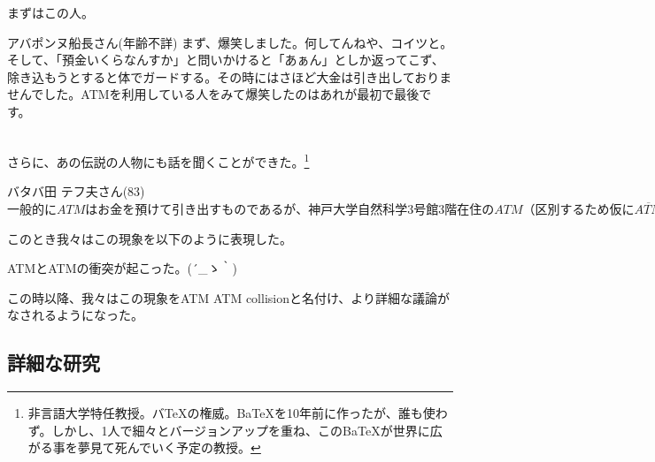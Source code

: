 \documentclass[12pt]{jsarticle}
\begin{document}
まずはこの人。\\

\begin{itembox}[c]{アバポンヌ船長さん(年齢不詳)}
まず、爆笑しました。何してんねや、コイツと。そして、「預金いくらなんすか」と問いかけると「あぁん」としか返ってこず、除き込もうとすると体でガードする。その時にはさほど大金は引き出しておりませんでした。ATMを利用している人をみて爆笑したのはあれが最初で最後です。
\end{itembox}
\\

さらに、あの伝説の人物にも話を聞くことができた。\footnote{非言語大学特任教授。バTeXの権威。BaTeXを10年前に作ったが、誰も使わず。しかし、1人で細々とバージョンアップを重ね、このBaTeXが世界に広がる事を夢見て死んでいく予定の教授。} \\
\begin{itembox}[c]{バタバ田 テフ夫さん(83) }
$一般的にATMはお金を預けて引き出すものであるが、神戸大学自然科学3号館3階在住のATM（区別するため仮に\overline{ATM}とする。）はこれとは逆の性質を持ち、お金を借り入れることができる。
このことから一部では\overline{ATM}がATMの反物質ではないかという理論予想がされていた。
これを実験的に確かめる方法は容易で、ATMと\overline{ATM}が衝突した時に対消滅を起こせば\overline{ATM}はATMの反物質であると断定できる。
しかしATMは反応断面積・ルミノシティ共に非常に小さいため、これを観測するのは至難の技であり、今日（こんにち）まで観測を行った人間は誰一人としていなかった。
そしてこの日、我々は奇跡的にその観測を成功させたのである。
ところが、ATMは消滅することなく、お金をATMから\overline{ATM}に与える形での相互作用を起こした。
こうして前述の理論は白紙に戻ったわけであるが、この観測がATM理論のブレイクスルーとなることを私は期待している。$
\end{itembox}

このとき我々はこの現象を以下のように表現した。\\
\begin{center}
{\LARGE \mc ATMとATMの衝突が起こった。{\sf (´\_ゝ｀)}}
\end{center}

この時以降、我々はこの現象をATM ATM collisionと名付け、より詳細な議論がなされるようになった。


\newpage
\subsection{詳細な研究}
\end{document}
